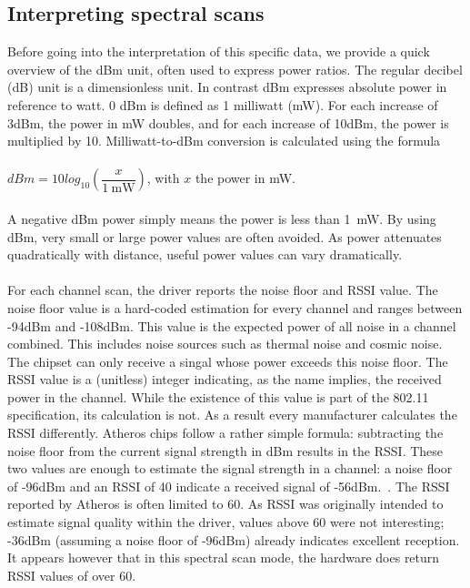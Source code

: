 \documentclass[a4paper, 11pt]{article}
\begin{document}
\subsection{Interpreting spectral scans} \label{sec:interpret}
Before going into the interpretation of this specific data, we provide a quick overview of the dBm unit, often used to express power ratios. The regular decibel (dB) unit is a dimensionless unit. In contrast dBm expresses absolute power in reference to watt. 0 dBm is defined as 1 milliwatt (mW). For each increase of 3dBm, the power in mW doubles, and for each increase of 10dBm, the power is multiplied by 10. Milliwatt-to-dBm conversion is calculated using the formula\\ \\ $dBm = 10 log_{10}(\dfrac{x}{\SI{1}{\milli\watt}})$, with $x$ the power in mW.\\ \\ A negative dBm power simply means the power is less than \SI{1}{\milli\watt}. By using dBm, very small or large power values are often avoided. As power attenuates quadratically with distance, useful power values can vary dramatically.\\\\
For each channel scan, the driver reports the noise floor and RSSI value. The noise floor value is a hard-coded estimation for every channel and ranges between -94dBm and -108dBm. This value is the expected power of all noise in a channel combined. This includes noise sources such as thermal noise and cosmic noise. The chipset can only receive a singal whose power exceeds this noise floor. The RSSI value is a (unitless) integer indicating, as the name implies, the received power in the channel. While the existence of this value is part of the 802.11 specification, its calculation is not. As a result every manufacturer calculates the RSSI differently. Atheros chips follow a rather simple formula: subtracting the noise floor from the current signal strength in dBm results in the RSSI. These two values are enough to estimate the signal strength in a channel: a noise floor of -96dBm and an RSSI of 40 indicate a received signal of -56dBm.~\cite{rssi-calc}. The RSSI reported by Atheros is often limited to 60. As RSSI was originally intended to estimate signal quality within the driver, values above 60 were not interesting; -36dBm (assuming a noise floor of -96dBm) already indicates excellent reception. It appears however that in this spectral scan mode, the hardware does return RSSI values of over 60. \\
\end{document}
